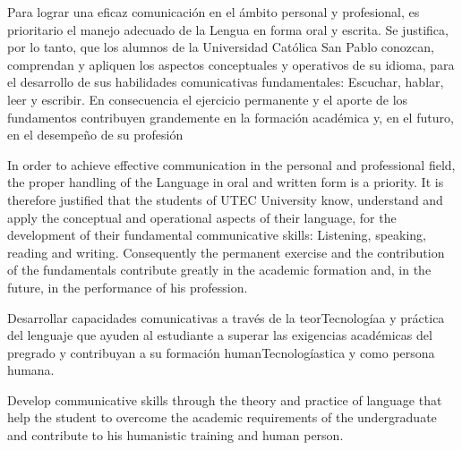 \begin{syllabus}


\begin{justification}
Para lograr una eficaz comunicación en el ámbito personal y profesional, es prioritario el manejo adecuado de la Lengua en forma oral y escrita. Se justifica, por lo tanto, que los alumnos de la Universidad Católica San Pablo conozcan, comprendan y apliquen los aspectos conceptuales y operativos de su idioma, para el desarrollo de sus habilidades comunicativas fundamentales: Escuchar, hablar, leer y escribir.
En consecuencia el ejercicio permanente y el aporte de los fundamentos contribuyen grandemente en la formación académica y, en el futuro, en el desempeño de su profesión

In order to achieve effective communication in the personal and professional field, the proper handling of the Language in oral and written form is a priority. It is therefore justified that the students of UTEC University know, understand and apply the conceptual and operational aspects of their language, for the development of their fundamental communicative skills: Listening, speaking, reading and writing.
Consequently the permanent exercise and the contribution of the fundamentals contribute greatly in the academic formation and, in the future, in the performance of his profession.
\end{justification}

\begin{goals}
\item Desarrollar capacidades comunicativas a través de la teorTecnologíaa y práctica del lenguaje que ayuden al estudiante a superar las exigencias académicas del pregrado y contribuyan a su formación humanTecnologíastica y como persona humana.

\item Develop communicative skills through the theory and practice of language that help the student to overcome the academic requirements of the undergraduate and contribute to his humanistic training and human person.
\end{goals}

\begin{outcomes}
    \item {}
    \item {}
\end{outcomes}


\end{syllabus}
